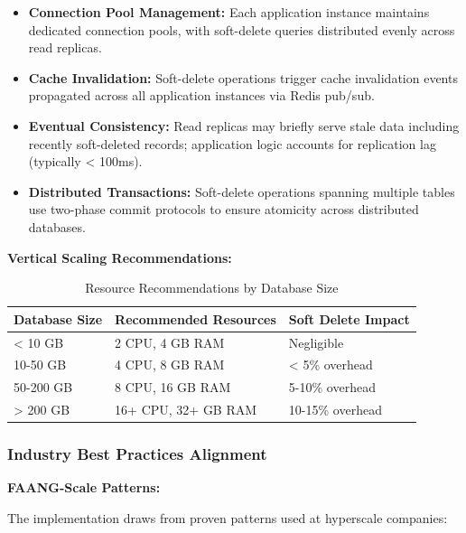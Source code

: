 \documentclass[12pt,a4paper]{article}
\begin{document}
\begin{itemize}[leftmargin=2em, itemsep=6pt]
    \item \textbf{Connection Pool Management:} Each application instance maintains dedicated connection pools, with soft-delete queries distributed evenly across read replicas.
    \item \textbf{Cache Invalidation:} Soft-delete operations trigger cache invalidation events propagated across all application instances via Redis pub/sub.
    \item \textbf{Eventual Consistency:} Read replicas may briefly serve stale data including recently soft-deleted records; application logic accounts for replication lag (typically < 100ms).
    \item \textbf{Distributed Transactions:} Soft-delete operations spanning multiple tables use two-phase commit protocols to ensure atomicity across distributed databases.
\end{itemize}

\vspace{0.5em}

\textbf{Vertical Scaling Recommendations:}

\begin{table}[H]
\centering
\begin{tabular}{|p{4cm}|p{4cm}|p{5cm}|}
\hline
\textbf{Database Size} & \textbf{Recommended Resources} & \textbf{Soft Delete Impact} \\
\hline
< 10 GB & 2 CPU, 4 GB RAM & Negligible \\
\hline
10-50 GB & 4 CPU, 8 GB RAM & < 5\% overhead \\
\hline
50-200 GB & 8 CPU, 16 GB RAM & 5-10\% overhead \\
\hline
> 200 GB & 16+ CPU, 32+ GB RAM & 10-15\% overhead \\
\hline
\end{tabular}
\caption{Resource Recommendations by Database Size}
\end{table}

\subsubsection{Industry Best Practices Alignment}

\textbf{FAANG-Scale Patterns:}

The implementation draws from proven patterns used at hyperscale companies:
\end{document}
